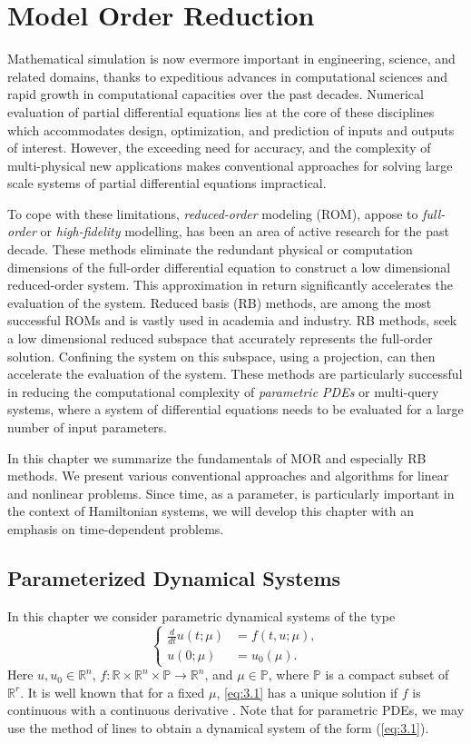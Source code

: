 \chapter{Model Order Reduction} \label{chapter:3}
Mathematical simulation is now evermore important in engineering, science, and related domains, thanks to expeditious advances in computational sciences and rapid growth in computational capacities over the past decades. Numerical evaluation of partial differential equations lies at the core of these disciplines which accommodates design, optimization, and prediction of inputs and outputs of interest. However, the exceeding need for accuracy, and the complexity of multi-physical new applications makes conventional approaches for solving large scale systems of partial differential equations impractical. 

To cope with these limitations, \emph{reduced-order} modeling (ROM), appose to \emph{full-order} or \emph{high-fidelity} modelling, has been an area of active research for the past decade. These methods eliminate the redundant physical or computation dimensions of the full-order differential equation to construct a low dimensional reduced-order system. This approximation in return significantly accelerates the evaluation of the system. Reduced basis (RB) methods, are among the most successful ROMs and is vastly used in academia and industry. RB methods, seek a low dimensional reduced subspace that accurately represents the full-order solution. Confining the system on this subspace, using a projection, can then accelerate the evaluation of the system. These methods are particularly successful in reducing the computational complexity of \emph{parametric PDEs} or multi-query systems, where a system of differential equations needs to be evaluated for a large number of input parameters.

In this chapter we summarize the fundamentals of MOR and especially RB methods. We present various conventional approaches and algorithms for linear and nonlinear problems. Since time, as a parameter, is particularly important in the context of Hamiltonian systems, we will develop this chapter with an emphasis on time-dependent problems.

\section{Parameterized Dynamical Systems}
In this chapter we consider parametric dynamical systems of the type
\begin{equation} \label{eq:3.1}
\left\{
\begin{aligned}
	\frac d{dt} u(t;\mu) &= f(t,u;\mu),\\
	u(0;\mu) &= u_0(\mu).
\end{aligned}
\right.
\end{equation}
Here $u,u_0\in \mathbb R^{n}$, $f:\mathbb R \times \mathbb R^{n} \times \mathbb P\to \mathbb R^{n}$, and $\mu \in \mathbb P$, where $\mathbb P$ is a compact subset of $\mathbb R^r$. It is well known that for a fixed $\mu$, \cref{eq:3.1} has a unique solution if $f$ is continuous with a continuous derivative \cite{rudin1976principles}. Note that for parametric PDEs, we may use the method of lines \cite{edsberg2015introduction} to obtain a dynamical system of the form (\ref{eq:3.1}).

